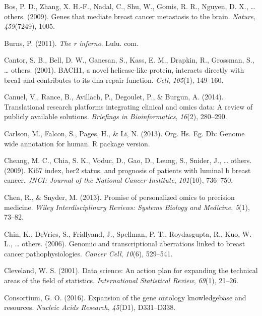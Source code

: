 \documentclass[12pt,twoside]{reedthesis}
\begin{document}
\leavevmode\hypertarget{ref-bos2009genes}{}%
Bos, P. D., Zhang, X. H.-F., Nadal, C., Shu, W., Gomis, R. R., Nguyen, D. X., \ldots{} others. (2009). Genes that mediate breast cancer metastasis to the brain. \emph{Nature}, \emph{459}(7249), 1005.

\leavevmode\hypertarget{ref-burns2011r}{}%
Burns, P. (2011). \emph{The r inferno}. Lulu. com.

\leavevmode\hypertarget{ref-cantor2001bach1}{}%
Cantor, S. B., Bell, D. W., Ganesan, S., Kass, E. M., Drapkin, R., Grossman, S., \ldots{} others. (2001). BACH1, a novel helicase-like protein, interacts directly with brca1 and contributes to its dna repair function. \emph{Cell}, \emph{105}(1), 149--160.

\leavevmode\hypertarget{ref-canuel2014translational}{}%
Canuel, V., Rance, B., Avillach, P., Degoulet, P., \& Burgun, A. (2014). Translational research platforms integrating clinical and omics data: A review of publicly available solutions. \emph{Briefings in Bioinformatics}, \emph{16}(2), 280--290.

\leavevmode\hypertarget{ref-carlson2013org}{}%
Carlson, M., Falcon, S., Pages, H., \& Li, N. (2013). Org. Hs. Eg. Db: Genome wide annotation for human. R package version.

\leavevmode\hypertarget{ref-cheang2009ki67}{}%
Cheang, M. C., Chia, S. K., Voduc, D., Gao, D., Leung, S., Snider, J., \ldots{} others. (2009). Ki67 index, her2 status, and prognosis of patients with luminal b breast cancer. \emph{JNCI: Journal of the National Cancer Institute}, \emph{101}(10), 736--750.

\leavevmode\hypertarget{ref-chen2013promise}{}%
Chen, R., \& Snyder, M. (2013). Promise of personalized omics to precision medicine. \emph{Wiley Interdisciplinary Reviews: Systems Biology and Medicine}, \emph{5}(1), 73--82.

\leavevmode\hypertarget{ref-chin2006genomic}{}%
Chin, K., DeVries, S., Fridlyand, J., Spellman, P. T., Roydasgupta, R., Kuo, W.-L., \ldots{} others. (2006). Genomic and transcriptional aberrations linked to breast cancer pathophysiologies. \emph{Cancer Cell}, \emph{10}(6), 529--541.

\leavevmode\hypertarget{ref-cleveland2001data}{}%
Cleveland, W. S. (2001). Data science: An action plan for expanding the technical areas of the field of statistics. \emph{International Statistical Review}, \emph{69}(1), 21--26.

\leavevmode\hypertarget{ref-gene2016expansion}{}%
Consortium, G. O. (2016). Expansion of the gene ontology knowledgebase and resources. \emph{Nucleic Acids Research}, \emph{45}(D1), D331--D338.
\end{document}
